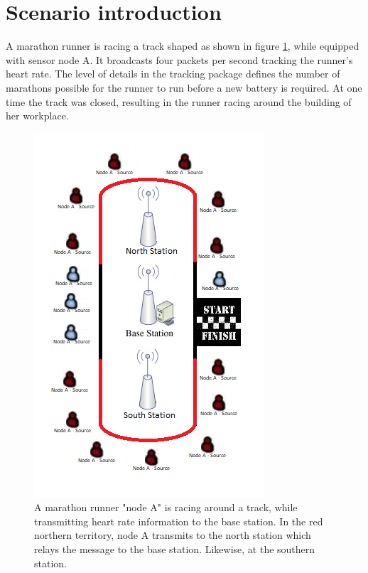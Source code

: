 \section{Scenario introduction}\label{sc:scenarioIntroduction}
A marathon runner is racing a track shaped as shown in figure \ref{fig:scenarioIntroduction}, while equipped with sensor node A. It broadcasts four packets per second tracking the runner’s heart rate. The level of details in the tracking package defines the number of marathons possible for the runner to run before a new battery is required. At one time the track was closed, resulting in the runner racing around the building of her workplace.

\begin{figure}[H]
	\centering
	\includegraphics[width=\linewidth]{introduction/scenario/fig/scenarioIntroduction.png}
	\caption{A marathon runner "node A" is racing around a track, while transmitting heart rate information to the base station. In the red northern territory, node A transmits to the north station which relays the message to the base station. Likewise, at the southern station.}
	\label{fig:scenarioIntroduction}
\end{figure}

